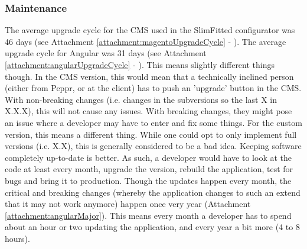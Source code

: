 \subsubsection{Maintenance}
The average upgrade cycle for the CMS used in the SlimFitted configurator was 46 days (see Attachment \ref{attachment:magentoUpgradeCycle} - \cite{magentoReleaseHistory}). The average upgrade cycle for Angular was 31 days (see Attachment \ref{attachment:angularUpgradeCycle} - \cite{angularReleaseHistory}). This means slightly different things though. In the CMS version, this would mean that a technically inclined person (either from Peppr, or at the client) has to push an 'upgrade' button in the CMS. With non-breaking changes (i.e. changes in the subversions so the last X in X.X.X), this will not cause any issues. With breaking changes, they might pose an issue where a developer may have to enter and fix some things.\newline
For the custom version, this means a different thing. While one could opt to only implement full versions (i.e. X.X), this is generally considered to be a bad idea. Keeping software completely up-to-date is better. As such, a developer would have to look at the code at least every month, upgrade the version, rebuild the application, test for bugs and bring it to production. Though the updates happen every month, the critical and breaking changes (whereby the application changes to such an extend that it may not work anymore) happen once very year (Attachment \ref{attachment:angularMajor}). This means every month a developer has to spend about an hour or two updating the application, and every year a bit more (4 to 8 hours).

